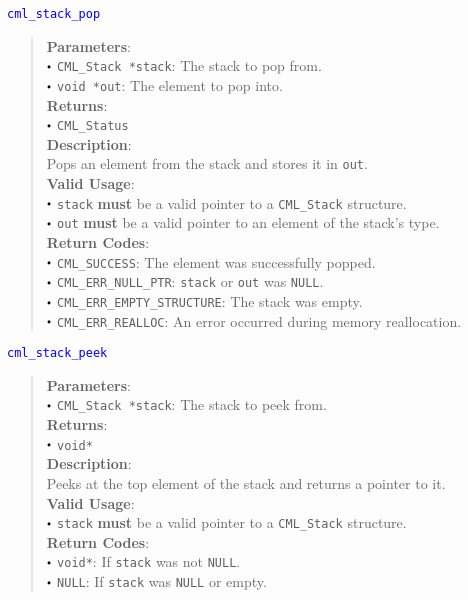 \documentclass[a4paper,oneside,8pt]{extarticle}
\newcommand{\function}[1]{
  \noindent\textcolor{blue}{\texttt{#1}}
  \vspace{-0.3em}
}
\renewcommand{\dot}{\raisebox{0.3ex}{\scalebox{0.6}{$\bullet$}}}
\theoremstyle{definition}
\begin{document}
\function{cml\_stack\_pop}
\begin{quote}
  \textbf{Parameters}: \\
  $\dot$ \texttt{CML\_Stack *stack}: The stack to pop from. \\
  $\dot$ \texttt{void *out}: The element to pop into. \\
  \textbf{Returns}: \\
  $\dot$ \texttt{CML\_Status} \\
  
  \vspace{-0.75em}
  \textbf{Description}: \\
  Pops an element from the stack and stores it in \texttt{out}. \\

  \vspace{-0.75em}
  \textbf{Valid Usage}: \\
  $\dot$ \texttt{stack} \textbf{must} be a valid pointer to a \texttt{CML\_Stack} structure. \\
  $\dot$ \texttt{out} \textbf{must} be a valid pointer to an element of the stack's type. \\

  \vspace{-0.75em}
  \textbf{Return Codes}: \\
  $\dot$ \texttt{CML\_SUCCESS}: The element was successfully popped. \\
  $\dot$ \texttt{CML\_ERR\_NULL\_PTR}: \texttt{stack} or \texttt{out} was \texttt{NULL}. \\
  $\dot$ \texttt{CML\_ERR\_EMPTY\_STRUCTURE}: The stack was empty. \\
  $\dot$ \texttt{CML\_ERR\_REALLOC}: An error occurred during memory reallocation. \\
\end{quote}

\function{cml\_stack\_peek}
\begin{quote}
  \textbf{Parameters}: \\
  $\dot$ \texttt{CML\_Stack *stack}: The stack to peek from. \\
  \textbf{Returns}: \\
  $\dot$ \texttt{void*} \\
  
  \vspace{-0.75em}
  \textbf{Description}: \\
  Peeks at the top element of the stack and returns a pointer to it. \\

  \vspace{-0.75em}
  \textbf{Valid Usage}: \\
  $\dot$ \texttt{stack} \textbf{must} be a valid pointer to a \texttt{CML\_Stack} structure. \\

  \vspace{-0.75em}
  \textbf{Return Codes}: \\
  $\dot$ \texttt{void*}: If \texttt{stack} was not \texttt{NULL}. \\
  $\dot$ \texttt{NULL}: If \texttt{stack} was \texttt{NULL} or empty. \\
\end{quote}
\end{document}
